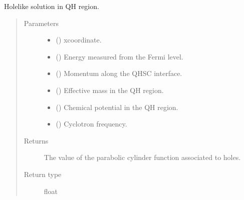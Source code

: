 \documentclass[letterpaper,10pt,english]{sphinxmanual}
\begin{document}

\begin{fulllineitems}
\label{\detokenize{modules:modules.functions.U_m}}
\pysigstartsignatures
{}
\pysigstopsignatures
\sphinxAtStartPar
Hole\sphinxhyphen{}like solution in QH region.
\begin{quote}\begin{description}
\item[{Parameters}] \leavevmode\begin{itemize}
\item {} 
\sphinxAtStartPar
{} () \textendash{} x\sphinxhyphen{}coordinate.

\item {} 
\sphinxAtStartPar
{} () \textendash{} Energy measured from the Fermi level.

\item {} 
\sphinxAtStartPar
{} () \textendash{} Momentum along the QH\sphinxhyphen{}SC interface.

\item {} 
\sphinxAtStartPar
{} () \textendash{} Effective mass in the QH region.

\item {} 
\sphinxAtStartPar
{} () \textendash{} Chemical potential in the QH region.

\item {} 
\sphinxAtStartPar
{} () \textendash{} Cyclotron frequency.

\end{itemize}

\item[{Returns}] \leavevmode
\sphinxAtStartPar
The value of the parabolic cylinder function associated to holes.

\item[{Return type}] \leavevmode
\sphinxAtStartPar
float

\end{description}\end{quote}

\end{fulllineitems}
\end{document}
